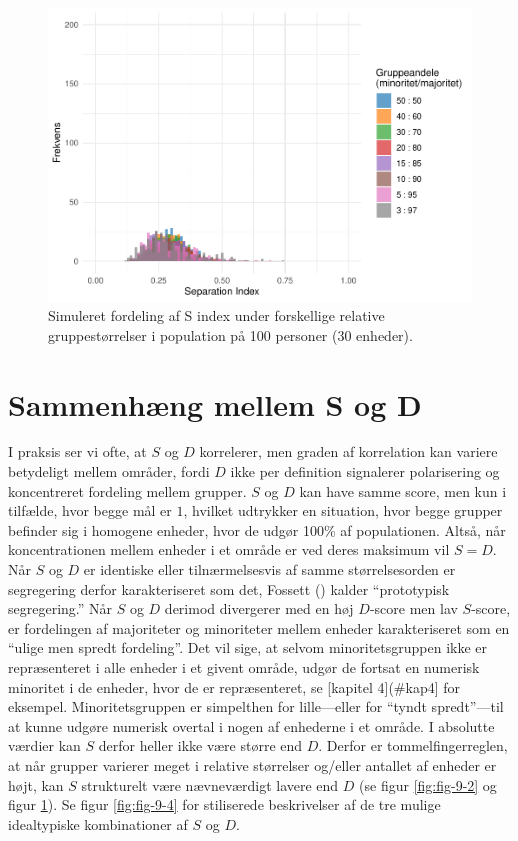 \documentclass[
]{book}
\begin{document}
\begin{figure}
\includegraphics[width=1\linewidth]{en-befolkning-blander-sig_files/figure-latex/fig-9-3-1} \caption{Simuleret fordeling af S index under forskellige relative gruppestørrelser i population på 100 personer (30 enheder).}\label{fig:fig-9-3}
\end{figure}

\newpage

\section{Sammenhæng mellem S og D}\label{forskel}

I praksis ser vi ofte, at \(S\) og \(D\) korrelerer, men graden af korrelation kan variere betydeligt mellem områder, fordi \(D\) ikke per definition signalerer polarisering og koncentreret fordeling mellem grupper. \(S\) og \(D\) kan have samme score, men kun i tilfælde, hvor begge mål er \(1\), hvilket udtrykker en situation, hvor begge grupper befinder sig i homogene enheder, hvor de udgør 100\% af populationen. Altså, når koncentrationen mellem enheder i et område er ved deres maksimum vil \(S=D\). Når \(S\) og \(D\) er identiske eller tilnærmelsesvis af samme størrelsesorden er segregering derfor karakteriseret som det, Fossett () kalder ``prototypisk segregering.'' Når \(S\) og \(D\) derimod divergerer med en høj \(D\)-score men lav \(S\)-score, er fordelingen af majoriteter og minoriteter mellem enheder karakteriseret som en ``ulige men spredt fordeling''. Det vil sige, at selvom minoritetsgruppen ikke er repræsenteret i alle enheder i et givent område, udgør de fortsat en numerisk minoritet i de enheder, hvor de er repræsenteret, se {[}kapitel 4{]}(\#kap4{]} for eksempel. Minoritetsgruppen er simpelthen for lille---eller for ``tyndt spredt''---til at kunne udgøre numerisk overtal i nogen af enhederne i et område. I absolutte værdier kan \(S\) derfor heller ikke være større end \(D\). Derfor er tommelfingerreglen, at når grupper varierer meget i relative størrelser og/eller antallet af enheder er højt, kan \(S\) strukturelt være nævneværdigt lavere end \(D\) (se figur \ref{fig:fig-9-2} og figur \ref{fig:fig-9-3}). Se figur \ref{fig:fig-9-4} for stiliserede beskrivelser af de tre mulige idealtypiske kombinationer af \(S\) og \(D\).
\end{document}
